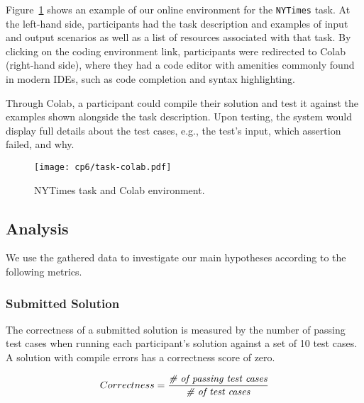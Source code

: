 {Figure~\ref{fig:nytimes-task-colab} shows an example of our online environment for the \texttt{NYTimes} task.
At the left-hand side, participants had the task description and examples of input and output scenarios as well as a list of resources associated with that task. 
By clicking on the coding environment link, participants were redirected to Colab (right-hand side),
where they had a code editor with amenities commonly found in modern IDEs, such as code completion and syntax highlighting. 



Through Colab, a participant could compile their solution and test it against the examples shown alongside the task description.
Upon testing, the system would display full details about the test cases, e.g., the test's input, which assertion failed, and why. 




\clearpage

\begin{landscape}
\begin{figure}
    \centering
    \texttt{[image: cp6/task-colab.pdf]}
    \caption{NYTimes task and Colab environment.}
    \label{fig:nytimes-task-colab}
\end{figure}
\end{landscape}

\clearpage


\subsection{Analysis}




We use the gathered data to investigate our main hypotheses according to the following metrics.



\subsubsection{Submitted Solution}

 
The correctness of a submitted solution is measured by the number of passing test cases
when running each participant's solution against a set of 10 test cases. 
A solution with compile errors has a correctness score of zero.


\smallskip
\begin{small}


\begin{equation}
    Correctness = \frac{ \text{\textit{\# of passing test cases}}}{\text{\textit{\#  of test cases}}}
\end{equation}
\end{small}

}
